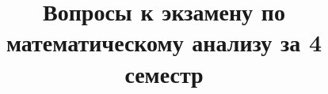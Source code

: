 \documentclass{article}
\title{%
	Вопросы к экзамену
	по математическому анализу за 4 семестр}
\date{}
\begin{document}
\theoremstyle{definition}
\newtheorem*{definition}{Определение}
\theoremstyle{plain}
\newtheorem{theorem}{Теорема}[section]
\newtheorem{axiom}{Аксиома}
\newtheorem{lemma}[theorem]{Лемма}
\newtheorem{statement}[theorem]{Утверждение}
\newtheorem{nb}[theorem]{N. B.}
\newtheorem{corollary}[theorem]{Следствие}
\theoremstyle{remark}
\newtheorem*{example}{Пример}
\newtheorem{property}[theorem]{Свойство}


\newcommand{\todo}{\textsc{\textbf{TODO}}}
\newcommand{\abs}[1]{\left|#1\right|}
\newcommand{\norm}[1]{\left\|#1\right\|}
\newcommand{\normp}[1]{\norm{#1}_p}
\newcommand{\normpp}[2]{\norm{#1}_{#2}}
\newcommand{\intl}[1]{\int\limits_{#1}}
\newcommand{\defeq}{\mathrel{\stackrel{\makebox[0pt]{\mbox{\normalfont\tiny def}}}{=}}}
\makeatletter
\newcommand*{\rom}[1]{\expandafter\@slowromancap\romannumeral #1@}
\makeatother
\newcommand{\iintl}[1]{\iint\limits_{#1}}
\newcommand{\pdiff}[2]{\frac{\partial #1}{\partial #2}}
\newcommand{\intlr}[2]{\int\limits_{#1}^{#2}}
\newcommand{\suml}[1]{\sum\limits_{#1}}
\newcommand{\sumlr}[2]{\sum\limits_{#1}^{#2}}
\newcommand{\feps}{\forall\varepsilon}
\newcommand{\Epsilon}{\varepsilon}
\newcommand{\scalarp}[2]{\langle #1 , #2\rangle}
\newcommand{\set}[1]{\left\{#1\right\}}
\maketitle
{}
\end{document}
